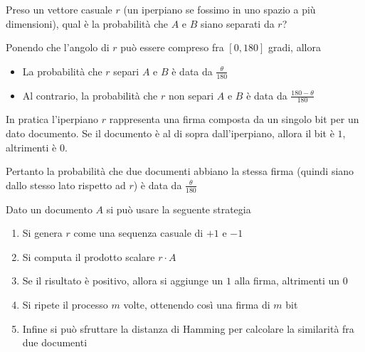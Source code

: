 			Preso un vettore casuale $r$ (un iperpiano se fossimo in uno spazio a più dimensioni), qual è la probabilità che $A$ e $B$ siano separati da $r$?

			Ponendo che l'angolo di $r$ può essere compreso fra $[0, 180]$ gradi, allora
			\begin{itemize}
				\item La probabilità che $r$ separi $A$ e $B$ è data da $\frac{\theta}{180}$
				\item Al contrario, la probabilità che $r$ non separi $A$ e $B$ è data da $\frac{180 - \theta}{180}$
			\end{itemize}

			\begin{remark}
				In pratica l'iperpiano $r$ rappresenta una firma composta da un singolo bit per un dato documento. Se il documento è al di sopra dall'iperpiano, allora il bit è $1$, altrimenti è $0$.
			\end{remark}

			Pertanto la probabilità che due documenti abbiano la stessa firma (quindi siano dallo stesso lato rispetto ad $r$) è data da
			$ \frac{\theta}{180} $

			\begin{remark}
				Dato un documento $A$ si può usare la seguente strategia
				
				\begin{enumerate}
					\item Si genera $r$ come una sequenza casuale di $+1$ e $-1$
					\item Si computa il prodotto scalare $r \cdot A$
					\item Se il risultato è positivo, allora si aggiunge un $1$ alla firma, altrimenti un $0$
					\item Si ripete il processo $m$ volte, ottenendo così una firma di $m$ bit
					\item Infine si può sfruttare la distanza di Hamming per calcolare la similarità fra due documenti
				\end{enumerate}
			\end{remark}

